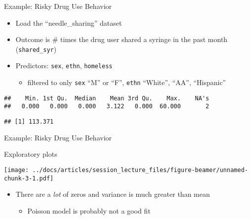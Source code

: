 \documentclass[
  ignorenonframetext,
]{beamer}
\newenvironment{Shaded}{\begin{snugshade}}{\end{snugshade}}
\newcommand{\DataTypeTok}[1]{\textcolor[rgb]{0.13,0.29,0.53}{#1}}
\newcommand{\KeywordTok}[1]{\textcolor[rgb]{0.13,0.29,0.53}{\textbf{#1}}}
\newcommand{\NormalTok}[1]{#1}
\newcommand{\OperatorTok}[1]{\textcolor[rgb]{0.81,0.36,0.00}{\textbf{#1}}}
\newcommand{\OtherTok}[1]{\textcolor[rgb]{0.56,0.35,0.01}{#1}}
\providecommand{\tightlist}{%
  \setlength{\itemsep}{0pt}\setlength{\parskip}{0pt}}
\begin{document}
\begin{frame}[fragile]{Example: Risky Drug Use Behavior}
\protect\hypertarget{example-risky-drug-use-behavior}{}

\begin{itemize}
\tightlist
\item
  Load the ``needle\_sharing'' dataset
\item
  Outcome is \# times the drug user shared a syringe in the past month
  (\texttt{shared\_syr})
\item
  Predictors: \texttt{sex}, \texttt{ethn}, \texttt{homeless}

  \begin{itemize}
  \tightlist
  \item
    filtered to only \texttt{sex} ``M'' or ``F'', \texttt{ethn}
    ``White'', ``AA'', ``Hispanic''
  \end{itemize}
\end{itemize}

\small

\begin{Shaded}
\end{Shaded}

\begin{verbatim}
##    Min. 1st Qu.  Median    Mean 3rd Qu.    Max.    NA's 
##   0.000   0.000   0.000   3.122   0.000  60.000       2
\end{verbatim}

\begin{Shaded}
\end{Shaded}

\begin{verbatim}
## [1] 113.371
\end{verbatim}

\end{frame}

\begin{frame}{Example: Risky Drug Use Behavior}
\protect\hypertarget{example-risky-drug-use-behavior-1}{}

Exploratory plots

\texttt{[image: ../docs/articles/session\_lecture\_files/figure-beamer/unnamed-chunk-3-1.pdf]}

\begin{itemize}
\tightlist
\item
  There are a \emph{lot} of zeros and variance is much greater than mean

  \begin{itemize}
  \tightlist
  \item
    Poisson model is probably not a good fit
  \end{itemize}
\end{itemize}

\end{frame}
\end{document}
